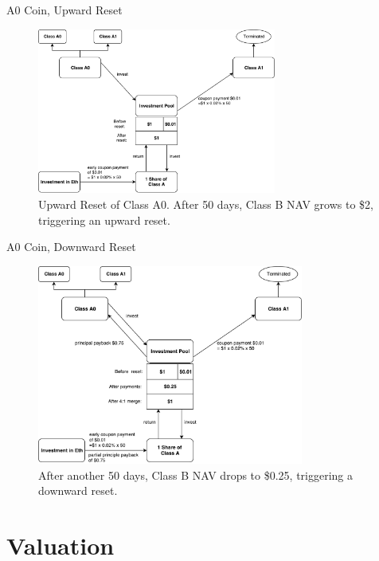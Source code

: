 \documentclass[notes=show, beamer, handout]{beamer}
\begin{document}
\begin{frame}{A0 Coin, Upward Reset}

\begin{figure}
\includegraphics[width=0.7\textwidth]{A0_upward.pdf}
\caption{\footnotesize Upward Reset of Class A0. After 50 days, Class B NAV grows to \$2, triggering an upward reset.}
\end{figure}

\end{frame}


\begin{frame}{A0 Coin, Downward Reset}

\begin{figure}
\includegraphics[width=0.78\textwidth]{A0_downward.pdf}
\caption{\footnotesize After another 50 days, Class B NAV drops to \$0.25, triggering a downward reset.}
\end{figure}


\end{frame}




\section{Valuation}
\end{document}
